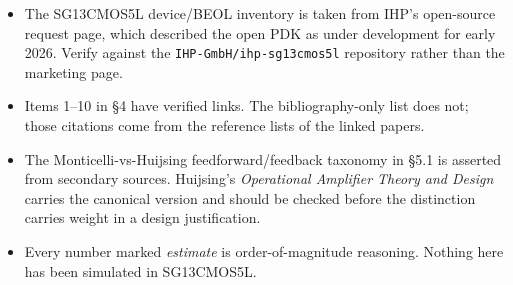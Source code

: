 \documentclass[
  10pt,
  a4paper,
]{article}
\providecommand{\tightlist}{%
  \setlength{\itemsep}{0pt}\setlength{\parskip}{0pt}}
\begin{document}
\begin{itemize}
\tightlist
\item
  The SG13CMOS5L device/BEOL inventory is taken from IHP's open-source
  request page, which described the open PDK as under development for
  early 2026. Verify against the \texttt{IHP-GmbH/ihp-sg13cmos5l}
  repository rather than the marketing page.
\item
  Items 1--10 in §4 have verified links. The bibliography-only list does
  not; those citations come from the reference lists of the linked
  papers.
\item
  The Monticelli-vs-Huijsing feedforward/feedback taxonomy in §5.1 is
  asserted from secondary sources. Huijsing's \emph{Operational
  Amplifier Theory and Design} carries the canonical version and should
  be checked before the distinction carries weight in a design
  justification.
\item
  Every number marked \emph{estimate} is order-of-magnitude reasoning.
  Nothing here has been simulated in SG13CMOS5L.
\end{itemize}
\end{document}
